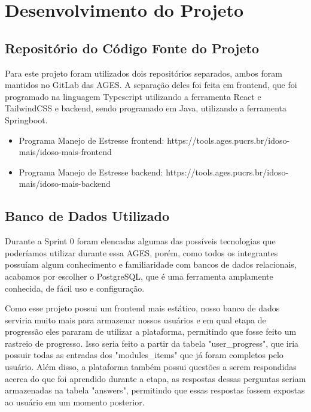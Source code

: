 \section[Desenvolvimento do Projeto]{Desenvolvimento do Projeto}

\subsection{Repositório do Código Fonte do Projeto}
  Para este projeto foram utilizados dois repositórios separados, ambos foram mantidos no GitLab das AGES. A separação deles foi feita em frontend, que foi programado na linguagem Typescript\cite{typescript} utilizando a ferramenta React\cite{react} e TailwindCSS\cite{tailwindcss} e backend, sendo programado em Java\cite{java}, utilizando a ferramenta Springboot\cite{springboot}.

    \begin{itemize}
      \item Programa Manejo de Estresse frontend: https://tools.ages.pucrs.br/idoso-mais/idoso-mais-frontend
      \item Programa Manejo de Estresse backend: https://tools.ages.pucrs.br/idoso-mais/idoso-mais-backend
    \end{itemize}

\subsection{Banco de Dados Utilizado}
  Durante a Sprint 0 foram elencadas algumas das possíveis tecnologias que poderíamos utilizar durante essa AGES, porém, como todos os integrantes possuíam algum conhecimento e familiaridade com bancos de dados relacionais, acabamos por escolher o PostgreSQL\cite{postgresql}, que é uma ferramenta amplamente conhecida, de fácil uso e configuração.
  
  Como esse projeto possui um frontend mais estático, nosso banco de dados serviria muito mais para armazenar nossos usuários e em qual etapa de progressão eles pararam de utilizar a plataforma, permitindo que fosse feito um rastreio de progresso. Isso seria feito a partir da tabela "user\_progress", que iria possuir todas as entradas dos "modules\_items" que já foram completos pelo usuário. Além disso, a plataforma também possui questões a serem respondidas acerca do que foi aprendido durante a etapa, as respostas dessas perguntas seriam armazenadas na tabela "answers", permitindo que essas respostas fossem expostas ao usuário em um momento posterior.

